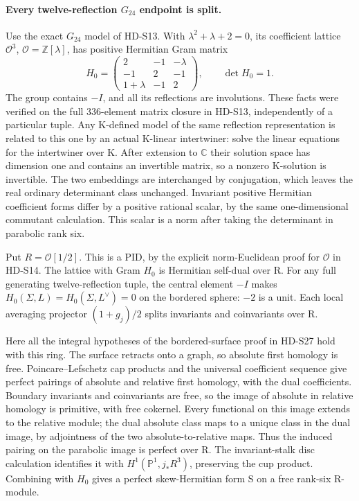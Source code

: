 \paragraph{Every twelve-reflection \(G_{24}\) endpoint is split.}
Use the exact \(G_{24}\) model of HD-S13. With
\(\lambda^2+\lambda+2=0\), its coefficient lattice
\(\mathcal O^3\), \(\mathcal O=\mathbb Z[\lambda]\), has
positive Hermitian Gram matrix
\[
 H_0=\begin{pmatrix}2&-1&-\lambda\\
                   -1&2&-1\\1+\lambda&-1&2\end{pmatrix},
                  \qquad\det H_0=1.
\]
The group contains \(-I\), and all its reflections are
involutions. These facts were verified on the full 336-element
matrix closure in HD-S13, independently of a particular tuple.
Any K-defined model of the same reflection representation is
related to this one by an actual K-linear intertwiner: solve the
linear equations for the intertwiner over K. After extension to
\(\mathbb C\) their solution space has dimension one and
contains an invertible matrix, so a nonzero K-solution is invertible.
The two embeddings are interchanged by conjugation, which leaves
the real ordinary determinant class unchanged. Invariant positive
Hermitian coefficient forms differ by a positive rational scalar,
by the same one-dimensional commutant calculation. This scalar
is a norm after taking the determinant in parabolic rank six.

Put \(R=\mathcal O[1/2]\). This is a PID, by the explicit
norm-Euclidean proof for \(\mathcal O\) in HD-S14. The lattice
with Gram \(H_0\) is Hermitian self-dual over R. For any full
generating twelve-reflection tuple, the central element \(-I\)
makes \(H_0(\Sigma,L)=H_0(\Sigma,L^\vee)=0\) on the
bordered sphere: \(-2\) is a unit. Each local averaging projector
\((1+g_j)/2\) splits invariants and coinvariants over R.

Here all the integral hypotheses of the bordered-surface proof in
HD-S27 hold with this ring. The surface retracts onto a graph, so
absolute first homology is free. Poincare--Lefschetz cap products
and the universal coefficient sequence give perfect pairings of
absolute and relative first homology, with the dual coefficients.
Boundary invariants and coinvariants are free, so the image of
absolute in relative homology is primitive, with free cokernel.
Every functional on this image extends to the relative module;
the dual absolute class maps to a unique class in the dual image,
by adjointness of the two absolute-to-relative maps. Thus the
induced pairing on the parabolic image is perfect over R. The
invariant-stalk disc calculation identifies it with
\(H^1(\mathbb P^1,j_*R^3)\), preserving the cup product.
Combining with \(H_0\) gives a perfect skew-Hermitian form S
on a free rank-six R-module.


